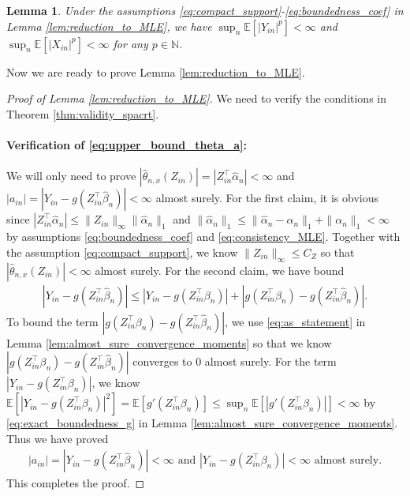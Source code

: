 \documentclass[12pt]{article}
\newtheorem{lemma}{Lemma}
\theoremstyle{definition}
\newcommand{\E}{\mathbb E}								%
\newcommand{\srx}{X}									%
\newcommand{\srz}{Z}									%
\newcommand{\sry}{Y}									%
\begin{document}
\begin{lemma}\label{lem:boundedness_moment}
  Under the assumptions \eqref{eq:compact_support}-\eqref{eq:boundedness_coef} in Lemma \ref{lem:reduction_to_MLE}, we have $\sup_{n}\E[|\sry_{in}|^p]<\infty$ and $\sup_{n}\E[|\srx_{in}|^p]<\infty$ for any $p\in\mathbb{N}$.
\end{lemma}

Now we are ready to prove Lemma \ref{lem:reduction_to_MLE}.

\begin{proof}[Proof of Lemma \ref{lem:reduction_to_MLE}]
  We need to verify the conditions in Theorem \ref{thm:validity_spacrt}. 

  \paragraph{Verification of \eqref{eq:upper_bound_theta_a}:}

  We will only need to prove $|\widehat \theta_{n,x}(\srz_{in})|=|Z_{in}^\top\widehat\alpha_n|<\infty$ and $|a_{in}|=|Y_{in}-g(Z_{in}^\top\widehat{\beta}_n)|<\infty$ almost surely. For the first claim, it is obvious since $|Z_{in}^\top\widehat\alpha_n|\leq \|\srz_{in}\|_{\infty}\|\widehat\alpha_n\|_1$ and $\|\widehat{\alpha}_n\|_1\leq \|\widehat{\alpha}_n-\alpha_n\|_1+\|\alpha_n\|_1<\infty$ by assumptions \eqref{eq:boundedness_coef} and \eqref{eq:consistency_MLE}. Together with the assumption \eqref{eq:compact_support}, we know $\|\srz_{in}\|_{\infty}\leq C_Z$ so that $|\widehat \theta_{n,x}(\srz_{in})|<\infty$ almost surely. For the second claim, we have bound 
    \begin{align*}
      |\sry_{in}-g(\srz_{in}^\top\widehat{\beta}_n)|\leq |\sry_{in}-g(\srz_{in}^\top\beta_n)|+|g(\srz_{in}^\top \beta_n)-g(\srz_{in}^\top\widehat\beta_n)|.
    \end{align*}
    To bound the term $|g(Z_{in}^\top \beta_n)-g(Z_{in}^\top\widehat\beta_n)|$, we use \eqref{eq:as_statement} in Lemma \ref{lem:almost_sure_convergence_moments} so that we know $|g(\srz_{in}^\top \beta_n)-g(\srz_{in}^\top\widehat\beta_n)|$ converges to $0$ almost surely. For the term $|Y_{in}-g(\srz_{in}^\top \beta_n)|$, we know $\E[|Y_{in}-g(\srz_{in}^\top \beta_n)|^2]=\E[g'(\srz_{in}^\top\beta_n)]\leq \sup_n\E[|g'(\srz_{in}^\top\beta_n)|]<\infty$ by \eqref{eq:exact_boundedness_g} in Lemma \ref{lem:almost_sure_convergence_moments}. Thus we have proved 
    \begin{align}\label{eq:boundedness_theta_a}
      |a_{in}|=|Y_{in}-g(Z_{in}^\top\widehat{\beta}_n)|<\infty\text{ and }|Y_{in}-g(Z_{in}^\top\beta_n)|<\infty\text{ almost surely}.
    \end{align}
    This completes the proof.


\end{proof}
\end{document}
